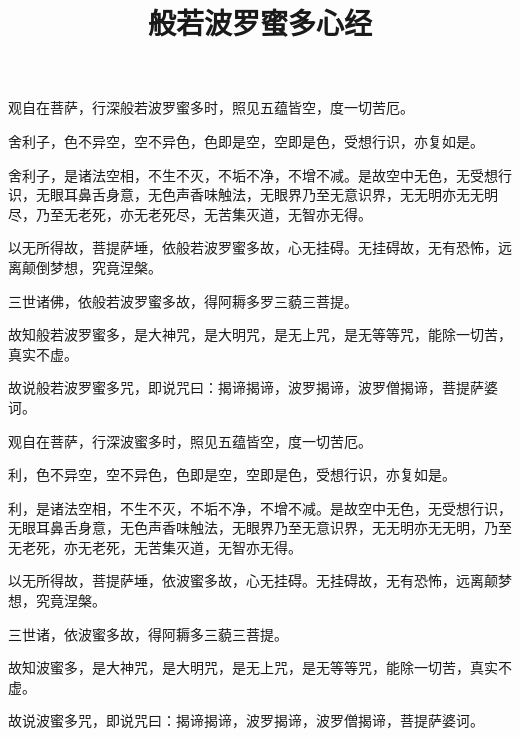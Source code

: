 \documentclass[a4paper,twoside]{article}
\title{般若波罗蜜多心经}
\author{}
\date{}
\begin{document}
\maketitle
\vspace{-5em}

\fontsize{14pt}{\baselineskip}\selectfont%

观自在菩萨，行深般若波罗蜜多时，照见五蕴皆空，度一切苦厄。


舍利子，色不异空，空不异色，色即是空，空即是色，受想行识，亦复如是。


舍利子，是诸法空相，不生不灭，不垢不净，不增不减。是故空中无色，无受想行识，无眼耳鼻舌身意，无色声香味触法，无眼界乃至无意识界，无无明亦无无明尽，乃至无老死，亦无老死尽，无苦集灭道，无智亦无得。


以无所得故，菩提萨埵，依般若波罗蜜多故，心无挂碍。无挂碍故，无有恐怖，远离颠倒梦想，究竟涅槃。


三世诸佛，依般若波罗蜜多故，得阿耨多罗三藐三菩提。


故知般若波罗蜜多，是大神咒，是大明咒，是无上咒，是无等等咒，能除一切苦，真实不虚。


故说般若波罗蜜多咒，即说咒曰：揭谛揭谛，波罗揭谛，波罗僧揭谛，菩提萨婆诃。
\clearpage
\vspace{5em}
\begin{pinyinscope}
观自在菩萨，行深波蜜多时，照见五蕴皆空，度一切苦厄。


利，色不异空，空不异色，色即是空，空即是色，受想行识，亦复如是。


利，是诸法空相，不生不灭，不垢不净，不增不减。是故空中无色，无受想行识，无眼耳鼻舌身意，无色声香味触法，无眼界乃至无意识界，无无明亦无无明，乃至无老死，亦无老死，无苦集灭道，无智亦无得。


以无所得故，菩提萨埵，依波蜜多故，心无挂碍。无挂碍故，无有恐怖，远离颠梦想，究竟涅槃。


三世诸，依波蜜多故，得阿耨多三藐三菩提。


故知波蜜多，是大神咒，是大明咒，是无上咒，是无等等咒，能除一切苦，真实不虚。


故说波蜜多咒，即说咒曰：揭谛揭谛，波罗揭谛，波罗僧揭谛，菩提萨婆诃。
\end{pinyinscope}
\end{document}
